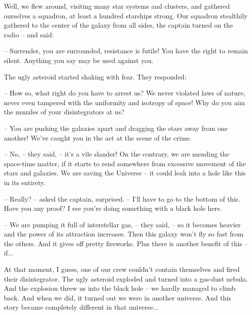 \documentclass[ebook,twoside,final,openright]{memoir}
\begin{document}
Well, we flew around, visiting many star systems and clusters, and gathered ourselves a squadron, at least a hundred starships strong. Our squadron stealthily gathered to the center of the galaxy from all sides, the captain turned on the radio – and said:\par
– Surrender, you are surrounded, resistance is futile! You have the right to remain silent. Anything you say may be used against you.\par
The ugly asteroid started shaking with fear. They responded:\par
– How so, what right do you have to arrest us? We never violated laws of nature, never even tampered with the uniformity and isotropy of space! Why do you aim the muzzles of your disintegrators at us?\par
– You are pushing the galaxies apart and dragging the stars away from one another! We’ve caught you in the act at the scene of the crime.\par
– No, – they said, – it’s a vile slander! On the contrary, we are mending the space-time matter, if it starts to rend somewhere from excessive movement of the stars and galaxies. We are saving the Universe – it could leak into a hole like this in its entirety.\par
– Really? – asked the captain, surprised. – I’ll have to go to the bottom of this. Have you any proof? I see you're doing something with a black hole here.\par
– We are pumping it full of interstellar gas, – they said, – so it becomes heavier and the power of its attraction increases. Then this galaxy won’t fly so fast from the others. And it gives off pretty fireworks. Plus there is another benefit of this – if...\par
At that moment, I guess, one of our crew couldn’t contain themselves and fired their disintegrator. The ugly asteroid exploded and turned into a gas-dust nebula. And the explosion threw us into the black hole – we hardly managed to climb back. And when we did, it turned out we were in another universe. And this story became completely different in that universe...
\end{document}

